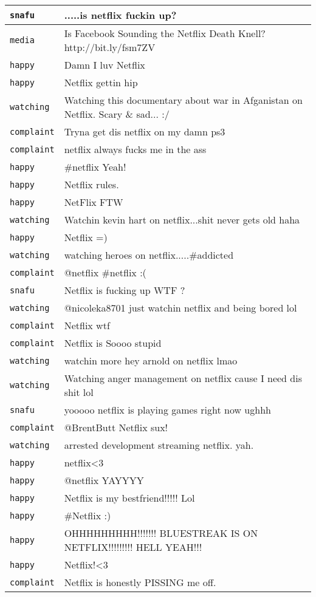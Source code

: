 \begin{center}
\begin{longtable}{|l|p{120mm}|}
      \tabularnewline\hline
         \texttt{snafu} & .....is netflix fuckin up?
      \tabularnewline\hline
         \texttt{media} & Is Facebook Sounding the Netflix Death Knell? http://bit.ly/fsm7ZV
      \tabularnewline\hline
         \texttt{happy} & Damn I luv Netflix
      \tabularnewline\hline
         \texttt{happy} & Netflix gettin hip
      \tabularnewline\hline
         \texttt{watching} & Watching this documentary about war in Afganistan on Netflix. Scary \& sad... :/
      \tabularnewline\hline
         \texttt{complaint} & Tryna get dis netflix on my damn ps3
      \tabularnewline\hline
         \texttt{complaint} & netflix always fucks me in the ass
      \tabularnewline\hline
         \texttt{happy} & \#netflix Yeah!
      \tabularnewline\hline
         \texttt{happy} & Netflix rules.
      \tabularnewline\hline
         \texttt{happy} & NetFlix FTW
      \tabularnewline\hline
         \texttt{watching} & Watchin kevin hart on netflix...shit never gets old haha
      \tabularnewline\hline
         \texttt{happy} & Netflix =)
      \tabularnewline\hline
         \texttt{watching} & watching heroes on netflix.....\#addicted
      \tabularnewline\hline
         \texttt{complaint} & @netflix \#netflix :(
      \tabularnewline\hline
         \texttt{snafu} & Netflix is fucking up WTF ?
      \tabularnewline\hline
         \texttt{watching} & @nicoleka8701 just watchin netflix and being bored lol
      \tabularnewline\hline
         \texttt{complaint} & Netflix wtf
      \tabularnewline\hline
         \texttt{complaint} & Netflix is Soooo stupid
      \tabularnewline\hline
         \texttt{watching} & watchin more hey arnold on netflix lmao
      \tabularnewline\hline
         \texttt{watching} & Watching anger management on netflix cause I need dis shit lol
      \tabularnewline\hline
         \texttt{snafu} & yooooo netflix is playing games right now ughhh
      \tabularnewline\hline
         \texttt{complaint} & @BrentButt Netflix sux!
      \tabularnewline\hline
         \texttt{watching} & arrested development streaming netflix. yah.
      \tabularnewline\hline
         \texttt{happy} & netflix<3
      \tabularnewline\hline
         \texttt{happy} & @netflix YAYYYY
      \tabularnewline\hline
         \texttt{happy} & Netflix is my bestfriend!!!!! Lol
      \tabularnewline\hline
         \texttt{happy} & \#Netflix :)
      \tabularnewline\hline
         \texttt{happy} & OHHHHHHHHH!!!!!!! BLUESTREAK IS ON NETFLIX!!!!!!!!! HELL YEAH!!!
      \tabularnewline\hline
         \texttt{happy} & Netflix!<3
      \tabularnewline\hline
         \texttt{complaint} & Netflix is honestly PISSING me off.

\end{longtable}
\end{center}

